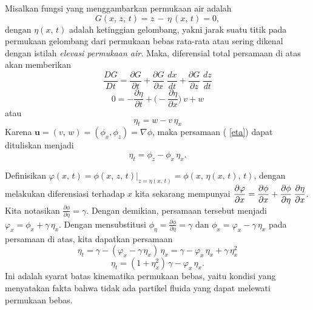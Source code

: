 \documentclass[12pt,a4paper]{report}
\begin{document}
Misalkan fungsi yang menggambarkan permukaan air adalah
\begin{equation}
\displaystyle G(x,\,z,\,t) = z \,-\, \eta\,(x,\,t) = 0,
\end{equation}
dengan $\eta(x,\,t)$ adalah ketinggian gelombang, yakni jarak suatu titik
pada permukaan gelombang dari permukaan bebas rata-rata atau sering dikenal
dengan istilah \textit{elevasi permukaan air.} Maka, diferensial total
persamaan di atas akan memberikan
\begin{equation}
\frac{DG}{Dt} = \frac{\partial G}{\partial t} + \frac{\partial G}{\partial x}%
\; \frac{dx}{dt} + \frac{\partial G}{\partial z}\; \frac{dz}{dt}
\end{equation}
\begin{equation}
0 = -\frac{\partial \eta}{\partial t} + \Bigg(-\frac{\partial \eta}{\partial
x}\Bigg)\:v + w
\end{equation}
atau
\begin{equation}
\eta_{t} = w - v\,\eta_{x}  \label{eta}
\end{equation}
Karena $\mathbf{u}=(v,\,w)= (\phi_{x},\phi_{z})=\nabla\phi$, maka persamaan (%
\ref{eta}) dapat dituliskan menjadi
\begin{equation}
\eta_{t} = \phi_{z} - \phi_{x}\,\eta_{x}.
\end{equation}

Definisikan $\varphi(x,\,t)= \left.\phi(x,\,z,\,t)\right|_{z=\eta(x,\,t)} =
\phi(x,\,\eta(x,\,t),\,t)$, dengan melakukan diferensiasi terhadap $x$ kita
sekarang mempunyai $\displaystyle\frac{\partial\varphi}{\partial x} = \frac{%
\partial\phi}{\partial x} + \frac{\partial\phi}{\partial\eta}\:\frac{%
\partial\eta}{\partial x}$. Kita notasikan $\displaystyle \frac{\partial \phi%
}{\partial \eta} = \gamma$. Dengan demikian, persamaan tersebut menjadi $%
\varphi_{x} = \phi_{x} + \gamma\,\eta_{x}.$ Dengan mensubstitusi $%
\displaystyle\phi_{\eta}=\frac{\partial \phi}{\partial \eta}=\gamma$ dan $%
\phi_{x} = \varphi_{x} - \gamma\,\eta_{x}$ pada persamaan di atas, kita
dapatkan persamaan
\begin{equation}
\eta_{t} = \gamma - (\varphi_{x} - \gamma\, \eta_{x})\,\eta_{x} = \gamma -
\varphi_{x}\,\eta_{x} + \gamma\, \eta_{x}^2
\end{equation}
\begin{equation}
\eta_{t} = (1 + \eta_{x}^2)\,\gamma - \varphi_{x}\,\eta_{x}.
\end{equation}
Ini adalah syarat batas kinematika permukaan bebas, yaitu kondisi yang
menyatakan fakta bahwa tidak ada partikel fluida yang dapat melewati
permukaan bebas.
\end{document}
